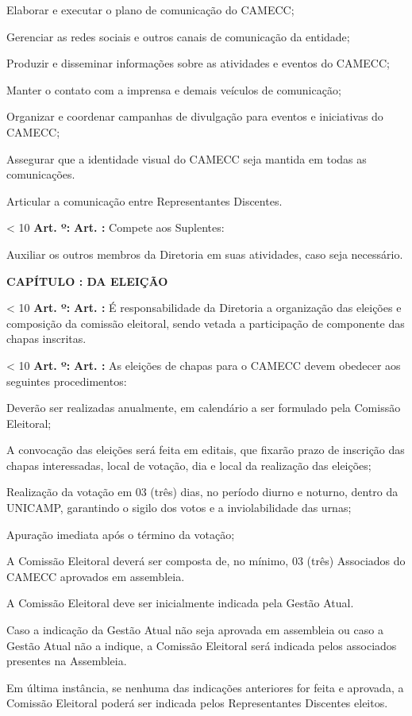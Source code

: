 \documentclass[capitulo]{br-lex}
\newcounter{chap}
\newcounter{sec}
\newcounter{art}
\newcommand{\capitulo}[1]{
    \vspace{20pt}
    \textbf{\uppercase{Capítulo} \Roman{chap}: \uppercase{#1}}
    \stepcounter{chap}
    \setcounter{sec}{1}
}
\renewcommand{\artigo}{
    \ifnum\value{art} < 10
        \textbf{Art. \arabic{art}º:}
    \else
        \textbf{Art. \arabic{art}:}
    \fi
    \stepcounter{art}
    \setcounter{inciso}{0}
    \setcounter{paragrafo}{0}
}
\begin{document}
\inciso Elaborar e executar o plano de comunicação do CAMECC;

\inciso Gerenciar as redes sociais e outros canais de comunicação da entidade;

\inciso Produzir e disseminar informações sobre as atividades e eventos do CAMECC;

\inciso Manter o contato com a imprensa e demais veículos de comunicação;

\inciso Organizar e coordenar campanhas de divulgação para eventos e iniciativas do CAMECC;

\inciso Assegurar que a identidade visual do CAMECC seja mantida em todas as comunicações.

\inciso Articular a comunicação entre Representantes Discentes.

\artigo Compete aos Suplentes:

\inciso Auxiliar os outros membros da Diretoria em suas atividades, caso seja necessário.

\capitulo{da Eleição}

\artigo É responsabilidade da Diretoria a organização das eleições e composição da comissão eleitoral, sendo vetada a participação de componente das chapas inscritas.

\artigo As eleições de chapas para o CAMECC devem obedecer aos seguintes procedimentos:

\inciso Deverão ser realizadas anualmente, em calendário a ser formulado pela Comissão Eleitoral;

\inciso A convocação das eleições será feita em editais, que fixarão prazo de inscrição das chapas interessadas, local de votação, dia e local da realização das eleições;

\inciso Realização da votação em 03 (três) dias, no período diurno e noturno, dentro da UNICAMP, garantindo o sigilo dos votos e a inviolabilidade das urnas;

\inciso Apuração imediata após o término da votação;

\inciso A Comissão Eleitoral deverá ser composta de, no mínimo, 03 (três) Associados do CAMECC aprovados em assembleia.

\paragrafo A Comissão Eleitoral deve ser inicialmente indicada pela Gestão Atual.

\paragrafo Caso a indicação da Gestão Atual não seja aprovada em assembleia ou caso a Gestão Atual não a indique, a Comissão Eleitoral será indicada pelos associados presentes na Assembleia.

\paragrafo Em última instância, se nenhuma das indicações anteriores for feita e aprovada, a Comissão Eleitoral poderá ser indicada pelos Representantes Discentes eleitos.
\end{document}
